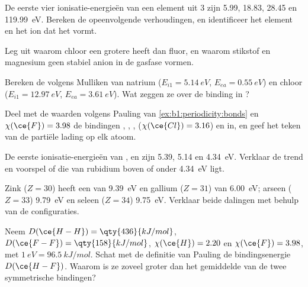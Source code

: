 \begin{exercise}[$\star\star$]\label{exo:b1:periodicity:5}
De eerste vier ionisatie-energieën van een element uit  3 zijn
5.99, 18.83, 28.45 en \qty{119.99}{eV}. Bereken de opeenvolgende
verhoudingen, en identificeer het element en het ion dat het vormt.
\end{exercise}

\begin{exercise}[$\star\star$]\label{exo:b1:periodicity:6}
Leg uit waarom chloor een grotere  heeft dan fluor,
en waarom stikstof en magnesium geen stabiel anion in de gasfase vormen.
\end{exercise}

\begin{exercise}[$\star\star$]\label{exo:b1:periodicity:7}
Bereken de  volgens Mulliken van natrium ($E_{i1} =
\qty{5.14}{eV}$, $E_{ea} = \qty{0.55}{eV}$) en chloor ($E_{i1} =
\qty{12.97}{eV}$, $E_{ea} = \qty{3.61}{eV}$). Wat zeggen ze over de
binding in ?
\end{exercise}

\begin{exercise}[$\star\star$]\label{exo:b1:periodicity:8}
Deel met de waarden volgens Pauling van \cref{ex:b1:periodicity:bonds} en $\chi(\ce{F})
= 3.98$ de bindingen , , , 
($\chi(\ce{Cl}) = 3.16$) en  in, en geef het teken van de
partiële lading op elk atoom.
\end{exercise}

\begin{exercise}[$\star\star$]\label{exo:b1:periodicity:9}
De eerste ionisatie-energieën van ,  en  zijn 5.39,
5.14 en \qty{4.34}{eV}. Verklaar de trend en voorspel of die van
rubidium boven of onder \qty{4.34}{eV} ligt.
\end{exercise}

\begin{exercise}[$\star\star\star$]\label{exo:b1:periodicity:10}
Zink ($Z = 30$) heeft een  van \qty{9.39}{eV} en
gallium ($Z = 31$) van \qty{6.00}{eV}; arseen ($Z = 33$) \qty{9.79}{eV}
en seleen ($Z = 34$) \qty{9.75}{eV}. Verklaar beide dalingen met behulp
van de configuraties.
\end{exercise}

\begin{exercise}[$\star\star\star$]\label{exo:b1:periodicity:11}
Neem $D(\ce{H-H}) = \qty{436}{kJ/mol}$, $D(\ce{F-F}) =
\qty{158}{kJ/mol}$, $\chi(\ce{H}) = 2.20$ en $\chi(\ce{F}) = 3.98$, met
$\qty{1}{eV} = \qty{96.5}{kJ/mol}$. Schat met de definitie van Pauling
de bindingsenergie $D(\ce{H-F})$. Waarom is ze zoveel groter dan het
gemiddelde van de twee symmetrische bindingen?
\end{exercise}

